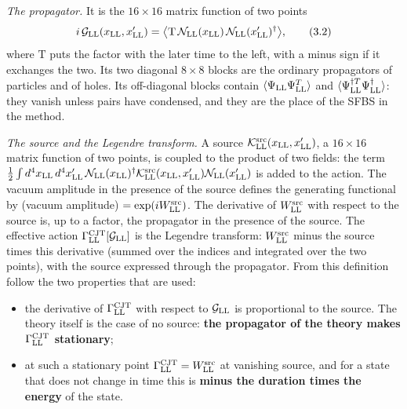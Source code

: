 \documentclass[
  10pt,
]{article}
\providecommand{\tightlist}{%
  \setlength{\itemsep}{0pt}\setlength{\parskip}{0pt}}
\begin{document}
\emph{The propagator.} It is the \(16\times16\) matrix function of two
points
\[i\,\mathcal G_{\rm LL}(x_{\rm LL},x'_{\rm LL})=\big\langle\mathrm T\,\mathcal N_{\rm LL}(x_{\rm LL})\,\mathcal N_{\rm LL}(x'_{\rm LL})^\dagger\big\rangle,\tag{3.2}\]
where \(\mathrm T\) puts the factor with the later time to the left,
with a minus sign if it exchanges the two. Its two diagonal \(8\times8\)
blocks are the ordinary propagators of particles and of holes. Its
off-diagonal blocks contain
\(\langle\Psi_{\rm LL}\Psi^T_{\rm LL}\rangle\) and
\(\langle\Psi^{\dagger T}_{\rm LL}\Psi^\dagger_{\rm LL}\rangle\): they
vanish unless pairs have condensed, and they are the place of the SFBS
in the method.

\emph{The source and the Legendre transform.} A source
\(\mathcal K^{\rm src}_{\rm LL}(x_{\rm LL},x'_{\rm LL})\), a
\(16\times16\) matrix function of two points, is coupled to the product
of two fields: the term
\(\tfrac12\int d^4x_{\rm LL}\,d^4x'_{\rm LL}\,\mathcal N_{\rm LL}(x_{\rm LL})^\dagger\mathcal K^{\rm src}_{\rm LL}(x_{\rm LL},x'_{\rm LL})\mathcal N_{\rm LL}(x'_{\rm LL})\)
is added to the action. The vacuum amplitude in the presence of the
source defines the generating functional by (vacuum amplitude)
\(=\exp(iW^{\rm src}_{\rm LL})\). The derivative of
\(W^{\rm src}_{\rm LL}\) with respect to the source is, up to a factor,
the propagator in the presence of the source. The effective action
\(\Gamma^{\rm CJT}_{\rm LL}[\mathcal G_{\rm LL}]\) is the Legendre
transform: \(W^{\rm src}_{\rm LL}\) minus the source times this
derivative (summed over the indices and integrated over the two points),
with the source expressed through the propagator. From this definition
follow the two properties that are used:

\begin{itemize}
\tightlist
\item
  the derivative of \(\Gamma^{\rm CJT}_{\rm LL}\) with respect to
  \(\mathcal G_{\rm LL}\) is proportional to the source. The theory
  itself is the case of no source: \textbf{the propagator of the theory
  makes \(\Gamma^{\rm CJT}_{\rm LL}\) stationary};
\item
  at such a stationary point
  \(\Gamma^{\rm CJT}_{\rm LL}=W^{\rm src}_{\rm LL}\) at vanishing
  source, and for a state that does not change in time this is
  \textbf{minus the duration times the energy} of the state.
\end{itemize}
\end{document}
